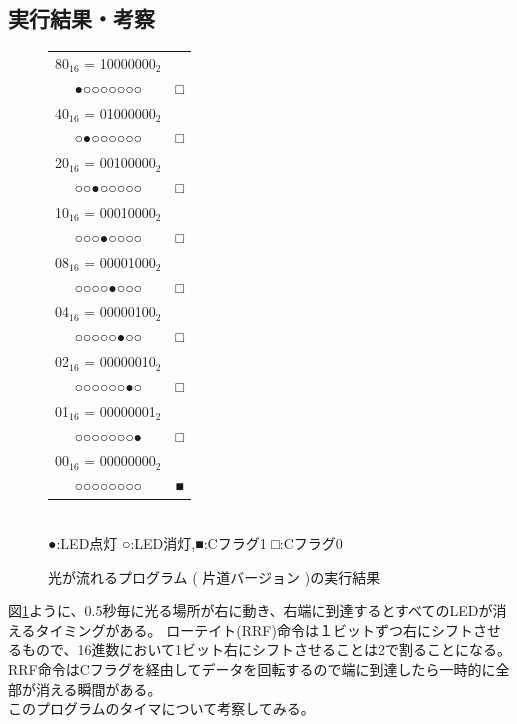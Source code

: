\documentclass[a4paper,12pt]{ujarticle}
\begin{document}
  \subsection{実行結果・考察}
   \begin{figure}[htbp]
    \begin{center}
     \begin{tabular}{cc}
      {80}$_{16}$ = 10000000$_2$ \\
      ●○○○○○○○ & □\\
      {40}$_{16}$ = 01000000$_2$ \\
      ○●○○○○○○ & □\\
      {20}$_{16}$ = 00100000$_2$ \\
      ○○●○○○○○ & □\\
      {10}$_{16}$ = 00010000$_2$ \\
      ○○○●○○○○ & □\\
      {08}$_{16}$  = 00001000$_2$ \\
      ○○○○●○○○ & □\\
      {04}$_{16}$  = 00000100$_2$ \\
      ○○○○○●○○ & □\\
      {02}$_{16}$  = 00000010$_2$ \\
      ○○○○○○●○ & □\\
      {01}$_{16}$  = 00000001$_2$ \\
      ○○○○○○○● & □\\
      {00}$_{16}$  = 00000000$_2$ \\
      ○○○○○○○○ & ■\\
     \end{tabular}\\
     ●:LED点灯 ○:LED消灯,■:Cフラグ1 □:Cフラグ0
    \end{center}
   \caption{光が流れるプログラム ( 片道バージョン )の実行結果}
   \label{fig:out_5-5}
   \end{figure}
   図\ref{fig:out_5-5}ように、0.5秒毎に光る場所が右に動き、右端に到達するとすべてのLEDが消えるタイミングがある。
   ローテイト(RRF)命令は１ビットずつ右にシフトさせるもので、16進数において1ビット右にシフトさせることは2で割ることになる。
   RRF命令はCフラグを経由してデータを回転するので端に到達したら一時的に全部が消える瞬間がある。
   \\

   このプログラムのタイマについて考察してみる。
\end{document}
